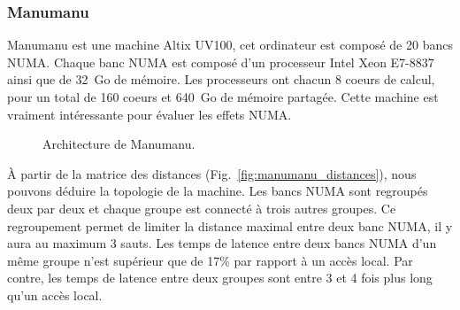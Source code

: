 \subsubsection{Manumanu}
Manumanu est une machine Altix UV100, cet ordinateur est composé de 20 bancs NUMA.
%
Chaque banc NUMA est composé d'un processeur Intel Xeon E7-8837 ainsi que de 32~Go de mémoire.
%
Les processeurs ont chacun 8 coeurs de calcul, pour un total de 160 coeurs et 640~Go de mémoire partagée.
%
Cette machine est vraiment intéressante pour évaluer les effets NUMA.

\begin{figure}[!h]
     \begin{center}
    \end{center}
    \caption{Architecture de Manumanu.}
    \label{fig:manumanu}
\end{figure}

\`{A} partir de la matrice des distances (Fig.~\ref{fig:manumanu_distances}), nous pouvons déduire la topologie de la machine.
%
Les bancs NUMA sont regroupés deux par deux et chaque groupe est connecté à trois autres groupes.
%
Ce regroupement permet de limiter la distance maximal entre deux banc NUMA, il y aura au maximum 3 sauts.
%
Les temps de latence entre deux bancs NUMA d'un même groupe n'est supérieur que de 17\% par rapport à un accès local.
%
Par contre, les temps de latence entre deux groupes sont entre 3 et 4 fois plus long qu'un accès local.
